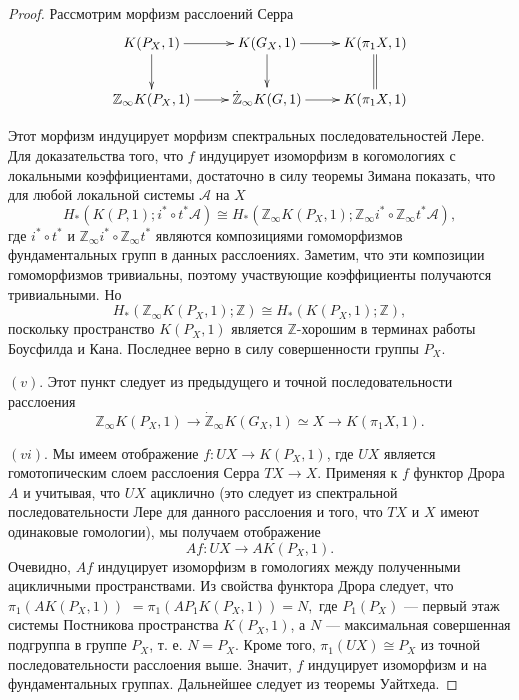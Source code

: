 \documentclass[14pt, dvipsnames]{extarticle}
\theoremstyle{definition}
\theoremstyle{remark}
\begin{document}
\begin{proof}

Рассмотрим морфизм расслоений Серра $$\xymatrix{
    K(P_X, 1) \ar[r] \ar[d] & K(G_X, 1) \ar[d] \ar[r] &  K(\pi_1X, 1) \ar@{=}[d] \\
    \mathbb{Z}_\infty K(P_X, 1) \ar[r]       & \dot{\mathbb{Z}}_\infty K(G, 1) \ar[r] &K(\pi_1X, 1) }$$ 
    
Этот морфизм индуцирует морфизм спектральных последовательностей Лере. Для доказательства того, что $f$ индуцирует изоморфизм в когомологиях с локальными коэффициентами, достаточно в силу теоремы Зимана показать, что для любой локальной системы $\mathcal{A}$ на $X$ $$H_\ast(K(P, 1); i^\ast\circ t^\ast\mathcal{A})\cong H_\ast(\mathbb{Z}_\infty K(P_X, 1); \mathbb{Z}_\infty i^\ast\circ \mathbb{Z}_\infty t^\ast\mathcal{A}),$$ где $i^\ast\circ t^\ast$ и $\mathbb{Z}_\infty i^\ast\circ \mathbb{Z}_\infty t^\ast$ являются композициями гомоморфизмов фундаментальных групп в данных расслоениях. Заметим, что эти композиции гомоморфизмов тривиальны, поэтому участвующие коэффициенты получаются тривиальными. Но $$H_\ast(\mathbb{Z}_\infty K(P_X, 1); \mathbb{Z})\cong H_\ast(K(P_X, 1); \mathbb{Z}),$$ поскольку пространство $K(P_X, 1)$ является $\mathbb{Z}$-хорошим в терминах работы Боусфилда и Кана. Последнее верно в силу совершенности группы $P_X$.


$(v)$. Этот пункт следует из предыдущего и точной последовательности расслоения $$\mathbb{Z}_\infty K(P_X,1)\to \dot{\mathbb{Z}}_\infty K(G_X, 1)\simeq X\to K(\pi_1X, 1).$$


$(vi)$. Мы имеем отображение $f: UX\to K(P_X, 1)$, где $UX$ является гомотопическим слоем расслоения Серра $TX\to X$. Применяя к $f$ функтор Дрора $A$ и учитывая, что $UX$ ациклично (это следует из спектральной последовательности Лере для данного расслоения и того, что $TX$ и $X$ имеют одинаковые гомологии), мы получаем отображение $$Af: UX\to AK(P_X, 1).$$ Очевидно, $Af$ индуцирует изоморфизм в гомологиях между полученными ацикличными пространствами. Из свойства функтора Дрора следует, что $\pi_1(AK(P_X, 1))$ $= \pi_1(AP_1K(P_X, 1)) = N,$ где $P_1(P_X)$ --- первый этаж системы Постникова пространства $K(P_X, 1)$, а $N$ --- максимальная совершенная подгруппа в группе $P_X$, т. е. $N = P_X$. Кроме того, $\pi_1(UX)\cong P_X$ из точной последовательности расслоения выше. Значит, $f$ индуцирует изоморфизм и на фундаментальных группах. Дальнейшее следует из теоремы Уайтхеда.




\end{proof}
\end{document}
